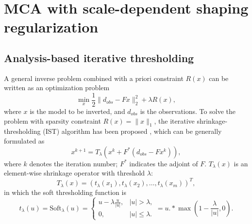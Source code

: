 \section{MCA with scale-dependent shaping regularization}

\subsection{Analysis-based iterative thresholding}

A general inverse problem combined with a priori constraint $R(x)$ can be written as an optimization problem
\begin{equation}\label{eq:sparsity3}
  \min_x \frac{1}{2}\|d_{obs}-F x\|_2^2+\lambda R(x),
\end{equation}
where $x$ is the model to be inverted, and $d_{obs}$ is the observations. To solve the problem with sparsity constraint $R(x)=\|x\|_1$, the iterative shrinkage-thresholding (IST) algorithm has been proposed  \citep{daubechies2004iterative}, which can be generally formulated as
\begin{equation}\label{eq:IST}
   x^{k+1}=T_{\lambda}(x^{k}+F^*(d_{obs}-Fx^{k})),
 \end{equation}
 where $k$ denotes the iteration number; $F^*$ indicates the adjoint of $F$. $T_{\lambda}(x)$ is an element-wise shrinkage operator with threshold $\lambda$:
 \begin{equation}
    T_{\lambda}(x)=(t_{\lambda}(x_1),t_{\lambda}(x_2),\ldots,t_{\lambda}(x_m))^T,
 \end{equation}
in which  the soft thresholding function \citep{donoho1995noising} is
 \begin{equation}
  t_{\lambda}(u)=\mathrm{Soft}_{\lambda}(u)=\left\{\begin{array}{ll}
                           u-\lambda\frac{u}{|u|}, & |u|> \lambda,\\
                           0, & |u|\leq \lambda.
                         \end{array}  \right.
	=u.*\max(1-\frac{\lambda}{|u|},0).
 \end{equation}

